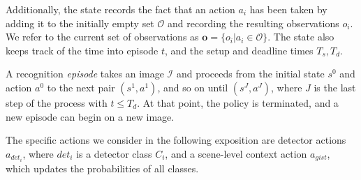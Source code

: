 Additionally, the state records the fact that an action $a_i$ has been taken by adding it to the initially empty set $\mathcal{O}$ and recording the resulting observations $o_i$.
We refer to the current set of observations as $\mathbf{o} = \{o_i | a_i \in \mathcal{O}\}$.
The state also keeps track of the time into episode $t$, and the setup and deadline times $T_s,T_d$.

A recognition \emph{episode} takes an image $\mathcal{I}$ and proceeds from the initial state $s^0$ and action $a^0$ to the next pair $(s^1,a^1)$, and so on until $(s^J,a^J)$, where $J$ is the last step of the process with $t \le T_d$.
At that point, the policy is terminated, and a new episode can begin on a new image.

The specific actions we consider in the following exposition are detector actions $a_{{det}_i}$, where ${det}_i$ is a detector class $C_i$, and a scene-level context action $a_{gist}$, which updates the probabilities of all classes.


